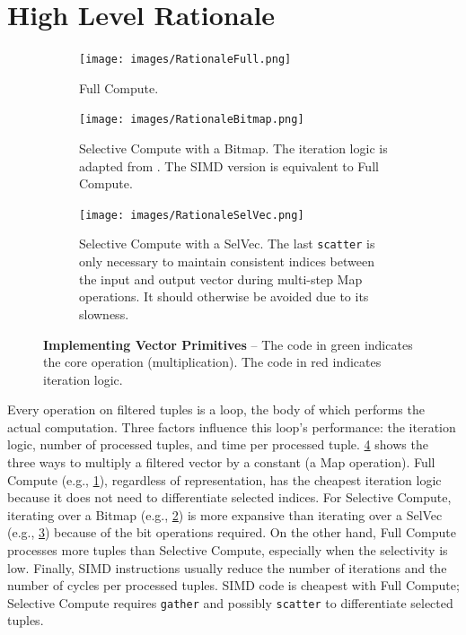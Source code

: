 \documentclass[12pt]{cmuthesis}
\begin{document}
\section{High Level Rationale}
\begin{figure}[t!]
\centering
\hspace*{\fill}%
\begin{subfigure}{.8\textwidth}
 \centering
 \texttt{[image: images/RationaleFull.png]}
 \caption{Full Compute.}
  \label{fig:rationale_full}
\end{subfigure}%
\hspace*{\fill}%
\vspace*{8pt}%

\hspace*{\fill}%
\begin{subfigure}{.8\textwidth}
 \centering
 \texttt{[image: images/RationaleBitmap.png]}
 \caption{Selective Compute with a Bitmap. The iteration logic is adapted from \cite{bitmap_iteration}. The SIMD version is equivalent to Full Compute.}
  \label{fig:rationale_bitmap}
\end{subfigure}%
\hspace*{\fill}%
\vspace*{8pt}%

\hspace*{\fill}%
\begin{subfigure}{.8\textwidth}
 \centering
 \texttt{[image: images/RationaleSelVec.png]}
 \caption{Selective Compute with a SelVec. The last \texttt{scatter} is only necessary to maintain consistent indices between the input and output vector during multi-step Map operations. It should otherwise be avoided due to its slowness.}
  \label{fig:rationale_selvec}
\end{subfigure}
\hspace*{\fill}%
\vspace*{8pt}%

\caption{\textbf{Implementing Vector Primitives} -- The code in green indicates the core operation (multiplication). The code in red indicates iteration logic.}
\label{fig:rationale_code}
\end{figure}


Every operation on filtered tuples is a loop, the body of which performs the actual computation. Three factors influence this loop's performance: the iteration logic, number of processed tuples, and time per processed tuple. \cref{fig:rationale_code} shows the three ways to multiply a filtered vector by a constant (a Map operation). Full Compute (e.g., \cref{fig:rationale_full}), regardless of representation, has the cheapest iteration logic because it does not need to differentiate selected indices. For Selective Compute, iterating over a Bitmap (e.g., \cref{fig:rationale_bitmap}) is more expansive than iterating over a SelVec (e.g., \cref{fig:rationale_selvec}) because of the bit operations required. On the other hand, Full Compute processes more tuples than Selective Compute, especially when the selectivity is low. Finally, SIMD instructions usually reduce the number of iterations and the number of cycles per processed tuples. SIMD code is cheapest with Full Compute; Selective Compute requires \texttt{gather} and possibly \texttt{scatter} to differentiate selected tuples.
\end{document}
